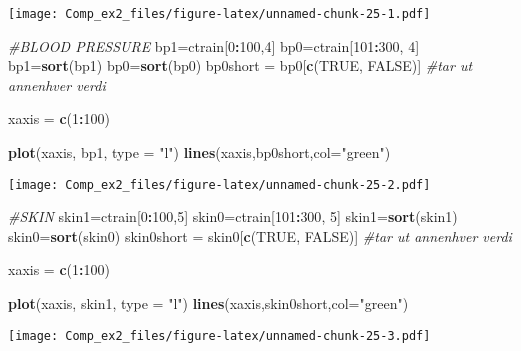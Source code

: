 \documentclass[]{article}
\newenvironment{Shaded}{\begin{snugshade}}{\end{snugshade}}
\newcommand{\KeywordTok}[1]{\textcolor[rgb]{0.13,0.29,0.53}{\textbf{#1}}}
\newcommand{\DataTypeTok}[1]{\textcolor[rgb]{0.13,0.29,0.53}{#1}}
\newcommand{\DecValTok}[1]{\textcolor[rgb]{0.00,0.00,0.81}{#1}}
\newcommand{\StringTok}[1]{\textcolor[rgb]{0.31,0.60,0.02}{#1}}
\newcommand{\CommentTok}[1]{\textcolor[rgb]{0.56,0.35,0.01}{\textit{#1}}}
\newcommand{\OtherTok}[1]{\textcolor[rgb]{0.56,0.35,0.01}{#1}}
\newcommand{\OperatorTok}[1]{\textcolor[rgb]{0.81,0.36,0.00}{\textbf{#1}}}
\newcommand{\NormalTok}[1]{#1}
\begin{document}
\texttt{[image: Comp\_ex2\_files/figure-latex/unnamed-chunk-25-1.pdf]}

\begin{Shaded}
\begin{Highlighting}[]
\CommentTok{#BLOOD PRESSURE }
\NormalTok{bp1=ctrain[}\DecValTok{0}\OperatorTok{:}\DecValTok{100}\NormalTok{,}\DecValTok{4}\NormalTok{]}
\NormalTok{bp0=ctrain[}\DecValTok{101}\OperatorTok{:}\DecValTok{300}\NormalTok{, }\DecValTok{4}\NormalTok{]}
\NormalTok{bp1=}\KeywordTok{sort}\NormalTok{(bp1)}
\NormalTok{bp0=}\KeywordTok{sort}\NormalTok{(bp0)}
\NormalTok{bp0short =}\StringTok{ }\NormalTok{bp0[}\KeywordTok{c}\NormalTok{(}\OtherTok{TRUE}\NormalTok{, }\OtherTok{FALSE}\NormalTok{)] }\CommentTok{#tar ut annenhver verdi }

\NormalTok{xaxis =}\StringTok{ }\KeywordTok{c}\NormalTok{(}\DecValTok{1}\OperatorTok{:}\DecValTok{100}\NormalTok{)}

\KeywordTok{plot}\NormalTok{(xaxis, bp1, }\DataTypeTok{type =} \StringTok{"l"}\NormalTok{)}
\KeywordTok{lines}\NormalTok{(xaxis,bp0short,}\DataTypeTok{col=}\StringTok{"green"}\NormalTok{)}
\end{Highlighting}
\end{Shaded}

\texttt{[image: Comp\_ex2\_files/figure-latex/unnamed-chunk-25-2.pdf]}

\begin{Shaded}
\begin{Highlighting}[]
\CommentTok{#SKIN }
\NormalTok{skin1=ctrain[}\DecValTok{0}\OperatorTok{:}\DecValTok{100}\NormalTok{,}\DecValTok{5}\NormalTok{]}
\NormalTok{skin0=ctrain[}\DecValTok{101}\OperatorTok{:}\DecValTok{300}\NormalTok{, }\DecValTok{5}\NormalTok{]}
\NormalTok{skin1=}\KeywordTok{sort}\NormalTok{(skin1)}
\NormalTok{skin0=}\KeywordTok{sort}\NormalTok{(skin0)}
\NormalTok{skin0short =}\StringTok{ }\NormalTok{skin0[}\KeywordTok{c}\NormalTok{(}\OtherTok{TRUE}\NormalTok{, }\OtherTok{FALSE}\NormalTok{)] }\CommentTok{#tar ut annenhver verdi }

\NormalTok{xaxis =}\StringTok{ }\KeywordTok{c}\NormalTok{(}\DecValTok{1}\OperatorTok{:}\DecValTok{100}\NormalTok{)}

\KeywordTok{plot}\NormalTok{(xaxis, skin1, }\DataTypeTok{type =} \StringTok{"l"}\NormalTok{)}
\KeywordTok{lines}\NormalTok{(xaxis,skin0short,}\DataTypeTok{col=}\StringTok{"green"}\NormalTok{)}
\end{Highlighting}
\end{Shaded}

\texttt{[image: Comp\_ex2\_files/figure-latex/unnamed-chunk-25-3.pdf]}
\end{document}
